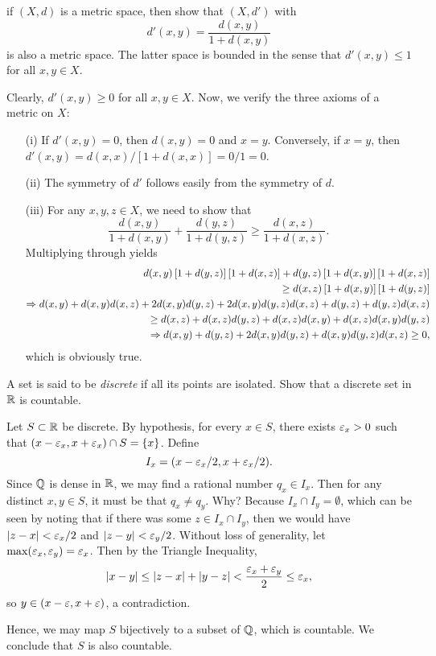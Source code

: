 \begin{exercise}
	if $(X,d)$ is a metric space, then show that $(X,d')$ with $$d'(x,y)=\dfrac{d(x,y)}{1+d(x,y)}$$ is also a metric space. The latter space is bounded in the sense that $d'(x,y) \le 1$ for all $x,y \in X$.
	
	\begin{sol}
		Clearly, $d'(x,y) \ge 0$ for all $x,y \in X$. Now, we verify the three axioms of a metric on $X$:
		\begin{enumerate}
			\item[(i)] If $d'(x,y)=0$, then $d(x,y)=0$ and $x=y$. Conversely, if $x=y$, then $d'(x,y)=d(x,x)/[1+d(x,x)]=0/1=0$.
			\item[(ii)] The symmetry of $d'$ follows easily from the symmetry of $d$.
			\item[(iii)] For any $x,y,z \in X$, we need to show that $$\dfrac{d(x,y)}{1+d(x,y)}+\dfrac{d(y,z)}{1+d(y,z)} \ge \dfrac{d(x,z)}{1+d(x,z)}.$$ Multiplying through yields
			\begin{align*}
				d(x,y)\left[1+d(y,z)\right]\left[1+d(x,z)\right]+d(y,z)\left[1+d(x,y)\right]\left[1+d(x,z)\right]  \\ \ge d(x,z)\left[1+d(x,y)\right]\left[1+d(y,z)\right] \\
				\Rightarrow d(x,y)+d(x,y)d(x,z)+2d(x,y)d(y,z)+2d(x,y)d(y,z)d(x,z)+d(y,z)+d(y,z)d(x,z) \\ \ge d(x,z)+d(x,z)d(y,z)+d(x,z)d(x,y)+d(x,z)d(x,y)d(y,z) \\
				\Rightarrow d(x,y)+d(y,z)+2d(x,y)d(y,z)+d(x,y)d(y,z)d(x,z) \ge 0,
			\end{align*}
			which is obviously true.
		\end{enumerate}
	\end{sol}
\end{exercise}

\begin{exercise}
	A set is said to be \emph{discrete} if all its points are isolated. Show that a discrete set in $\mathbb R$ is countable.
	
	\begin{sol}
		Let $S \subset \mathbb R$ be discrete. By hypothesis, for every $x \in S$, there exists $\varepsilon_x>0$ such that $(x-\varepsilon_x,x+\varepsilon_x) \cap S=\{x\}$. Define $$I_x=(x-\varepsilon_x/2,x+\varepsilon_x/2).$$ Since $\mathbb Q$ is dense in $\mathbb R$, we may find a rational number $q_x \in I_x$. Then for any distinct $x,y \in S$, it must be that $q_x \neq q_y$. Why? Because $I_x \cap I_y=\emptyset$, which can be seen by noting that if there was some $z \in I_x \cap I_y$, then we would have $\lvert z-x \rvert < \varepsilon_x/2$ and $\lvert z-y \rvert< \varepsilon_y/2$. Without loss of generality, let $\max(\varepsilon_x,\varepsilon_y)=\varepsilon_x$. Then by the Triangle Inequality, $$\lvert x-y \rvert \le \lvert z-x \rvert+\lvert y-z \rvert<\dfrac{\varepsilon_x+\varepsilon_y}{2} \le \varepsilon_x,$$ so $y \in (x-\varepsilon,x+\varepsilon)$, a contradiction.
		
		Hence, we may map $S$ bijectively to a subset of $\mathbb Q$, which is countable. We conclude that $S$ is also countable.
	\end{sol}
\end{exercise}

